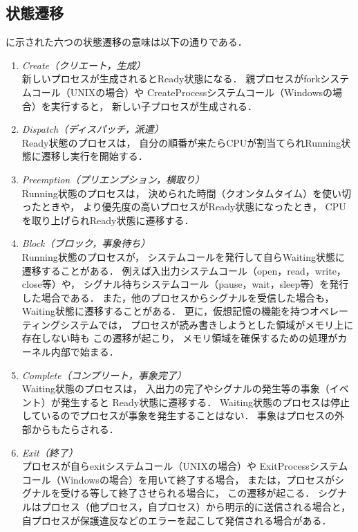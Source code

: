 \subsection{状態遷移}
に示された六つの状態遷移の意味は以下の通りである．

\begin{enumerate}
\item \emph{Create（クリエート，生成）} \\
  新しいプロセスが生成されるとReady状態になる．
  親プロセスがforkシステムコール（UNIXの場合）や
  CreateProcessシステムコール（Windowsの場合）を実行すると，
  新しい子プロセスが生成される．
\item \emph{Dispatch（ディスパッチ，派遣）} \\
  Ready状態のプロセスは，
  自分の順番が来たらCPUが割当てられRunning状態に遷移し実行を開始する．
\item \emph{Preemption（プリエンプション，横取り）} \\
  Running状態のプロセスは，
  決められた時間（クオンタムタイム）を使い切ったときや，
  より優先度の高いプロセスがReady状態になったとき，
  CPUを取り上げられReady状態に遷移する．
\item \emph{Block（ブロック，事象待ち）} \\
  Running状態のプロセスが，
  システムコールを発行して自らWaiting状態に遷移することがある．
  例えば入出力システムコール（open，read，write，close等）や，
  シグナル待ちシステムコール（pause，wait，sleep等）を発行した場合である．
  また，他のプロセスからシグナルを受信した場合も，
  Waiting状態に遷移することがある．
  更に，仮想記憶の機能を持つオペレーティングシステムでは，
  プロセスが読み書きしようとした領域がメモリ上に存在しない時も
  この遷移が起こり，
  メモリ領域を確保するための処理がカーネル内部で始まる．
\item \emph{Complete（コンプリート，事象完了）} \\
  Waiting状態のプロセスは，
  入出力の完了やシグナルの発生等の事象（イベント）が発生すると
  Ready状態に遷移する．
  Waiting状態のプロセスは停止しているのでプロセスが事象を発生することはない．
  事象はプロセスの外部からもたらされる．
\item \emph{Exit（終了）} \\
  プロセスが自らexitシステムコール（UNIXの場合）や
  ExitProcessシステムコール（Windowsの場合）を用いて終了する場合，
  または，プロセスがシグナルを受ける等して終了させられる場合に，
  この遷移が起こる．
  シグナルはプロセス（他プロセス，自プロセス）から明示的に送信される場合と，
  自プロセスが保護違反などのエラーを起こして発信される場合がある．
\end{enumerate}

